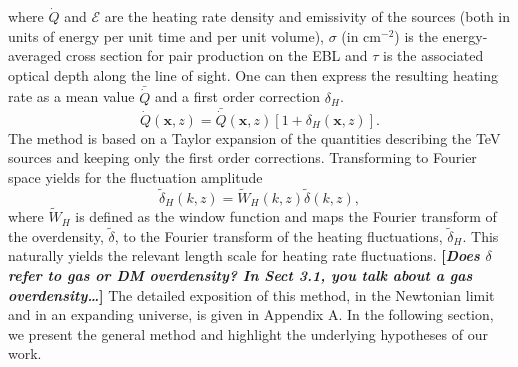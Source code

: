 \documentclass[twocolumns]{emulateapj}
\newcommand\Cc[1]{{\color{blue} \bf #1}} %
\begin{document}
where $\dot{Q}$ and $\mathcal{E}$ are the heating rate density and emissivity of the sources (both in units of energy per unit time and per unit volume), $\sigma$ (in cm$^{-2}$) is the energy-averaged cross section for pair production on the EBL and $\tau$ is the associated optical depth along the line of sight.
One can then express the resulting heating rate as a mean value $\bar{\dot{Q}}$ and a first order correction $\delta_H$.
\begin{equation}
\label{eq:delta_h}
\dot{Q}(\mathbf{x},z)=\bar{\dot{Q}}(\mathbf{x},z)\left[1+\delta_H(\mathbf{x},z)\right].
\end{equation}
The method is based on a Taylor expansion of the quantities describing the TeV sources and keeping only the first order corrections. Transforming to Fourier space yields for the fluctuation amplitude
\begin{equation}
\label{eq:use_window}
\tilde{\delta}_H(k,z)=\tilde{W}_H(k,z)\tilde{\delta}(k,z),
\end{equation}
where $\tilde{W}_H$ is defined as the window function and maps the Fourier transform of the overdensity, $\tilde{\delta}$, to the Fourier transform of the heating fluctuations, $\tilde{\delta}_H$. This naturally yields the relevant length scale for heating rate fluctuations. \Cc{[{\em Does $\delta$ refer to gas or DM overdensity? In Sect 3.1, you talk about a gas overdensity\ldots}]}
The detailed exposition of this method, in the Newtonian limit and in an expanding universe, is given in Appendix A. In the following section, we present the general method and highlight the underlying hypotheses of our work.
\end{document}
